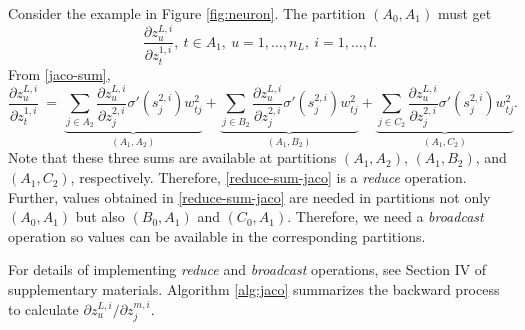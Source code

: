 \documentclass[12pt]{article}
\begin{document}
Consider the example in Figure \ref{fig:neuron}. The partition $(A_0,A_1)$ must get
\begin{equation*}
	\frac{\partial z^{L,i}_u}{\partial z^{1,i}_t},\ t \in A_1,\ u=1,\ldots,n_L,\ i=1,\ldots,l.
\end{equation*}
From \eqref{jaco-sum},
\begin{equation}
    \frac{\partial z^{L,i}_u}{\partial z^{1,i}_t}\ =\ \underbrace{\sum_{j \in A_2} \frac{\partial z^{L,i}_u}{\partial z^{2,i}_j} \sigma'(s^{2,i}_j) w^2_{tj} }_{(A_1,A_2)}
                                                     +\underbrace{\sum_{j \in B_2} \frac{\partial z^{L,i}_u}{\partial z^{2,i}_j} \sigma'(s^{2,i}_j) w^2_{tj} }_{(A_1,B_2)}
    												 +\underbrace{\sum_{j \in C_2} \frac{\partial z^{L,i}_u}{\partial z^{2,i}_j} \sigma'(s^{2,i}_j) w^2_{tj} }_{(A_1,C_2)}.
\label{reduce-sum-jaco}
\end{equation}
Note that these three sums are available at partitions $(A_1,A_2)$, $(A_1,B_2)$, and $(A_1,C_2)$, respectively. Therefore, \eqref{reduce-sum-jaco} is a {\it reduce} operation.
Further, values obtained in \eqref{reduce-sum-jaco} are needed in partitions not only $(A_0,A_1)$ but also $(B_0,A_1)$ and $(C_0,A_1)$. Therefore, we need a {\it broadcast}
operation so values can be available in the corresponding partitions.

For details of implementing {\it reduce} and {\it broadcast} operations, see Section IV of supplementary materials. Algorithm \ref{alg:jaco} summarizes the backward process to calculate $\partial z^{L,i}_u/\partial z^{m,i}_j$. 
\end{document}
